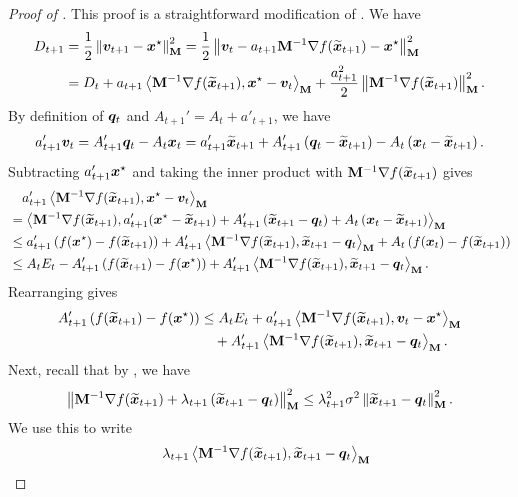 \begin{proof}[Proof of ]
This proof is a straightforward modification of \cite[Proposition 1]{chjjs22}. We have
\begin{align*}
    D_{t+1} &= \frac{1}{2}\left\lVert \bm{v}_{t+1}-\bm{x}^{\star} \right\rVert_{\mathbf{M}}^2 = \frac{1}{2}\left\lVert \bm{v}_t-a_{t+1}\mathbf{M}^{-1}\nabla f(\widetilde{\bm{x}}_{t+1})-\bm{x}^{\star} \right\rVert_{\mathbf{M}}^2 \\
    &= D_t + a_{t+1}\left\langle \mathbf{M}^{-1}\nabla f(\widetilde{\bm{x}}_{t+1}), \bm{x}^{\star}-\bm{v}_t \right\rangle_{\mathbf{M}} + \frac{a_{t+1}^2}{2}\left\lVert \mathbf{M}^{-1}\nabla f(\widetilde{\bm{x}}_{t+1}) \right\rVert_{\mathbf{M}}^2.
\end{align*}
By definition of $\bm{q}_t$ and $A_{t+1}' = A_t + a'_{t+1}$, we have
\begin{align*}
    a_{t+1}'\bm{v}_t = A_{t+1}'\bm{q}_t - A_t\bm{x}_t = a_{t+1}'\widetilde{\bm{x}}_{t+1} + A'_{t+1}\left(\bm{q}_t-\widetilde{\bm{x}}_{t+1}\right) - A_t\left(\bm{x}_t-\widetilde{\bm{x}}_{t+1}\right).
\end{align*}
Subtracting $a_{t+1}'\bm{x}^{\star}$ and taking the inner product with $\mathbf{M}^{-1}\nabla f(\widetilde{\bm{x}}_{t+1})$ gives
\begin{align*}
    &\quad a_{t+1}'\left\langle \mathbf{M}^{-1}\nabla f(\widetilde{\bm{x}}_{t+1}), \bm{x}^{\star}-\bm{v}_t \right\rangle_{\mathbf{M}} \\
    &= \left\langle \mathbf{M}^{-1}\nabla f(\widetilde{\bm{x}}_{t+1}),  a_{t+1}'(\bm{x}^{\star}-\widetilde{\bm{x}}_{t+1}) + A'_{t+1}\left(\widetilde{\bm{x}}_{t+1}-\bm{q}_t\right) + A_t\left(\bm{x}_t-\widetilde{\bm{x}}_{t+1}\right) \right\rangle_{\mathbf{M}} \\
    &\le a_{t+1}'\left(f(\bm{x}^{\star})-f(\widetilde{\bm{x}}_{t+1})\right)+A_{t+1}'\left\langle \mathbf{M}^{-1}\nabla f(\widetilde{\bm{x}}_{t+1}),\widetilde{\bm{x}}_{t+1}-\bm{q}_t \right\rangle_{\mathbf{M}} + A_t\left(f(\bm{x}_t)-f(\widetilde{\bm{x}}_{t+1})\right) \\
    &\le A_tE_t-A_{t+1}'\left(f(\widetilde{\bm{x}}_{t+1})-f(\bm{x}^{\star})\right)+A_{t+1}'\left\langle \mathbf{M}^{-1}\nabla f(\widetilde{\bm{x}}_{t+1}),\widetilde{\bm{x}}_{t+1}-\bm{q}_t \right\rangle_{\mathbf{M}}.
\end{align*}
Rearranging gives
\begin{align*}
    A_{t+1}'\left(f(\widetilde{\bm{x}}_{t+1})-f(\bm{x}^{\star})\right) &\le A_tE_t+a_{t+1}'\left\langle \mathbf{M}^{-1}\nabla f(\widetilde{\bm{x}}_{t+1}), \bm{v}_t-\bm{x}^{\star} \right\rangle_{\mathbf{M}}\\
    &\quad +A_{t+1}'\left\langle \mathbf{M}^{-1}\nabla f(\widetilde{\bm{x}}_{t+1}),\widetilde{\bm{x}}_{t+1}-\bm{q}_t \right\rangle_{\mathbf{M}}.
\end{align*}
Next, recall that by , we have
\begin{align*}
    \left\lVert \mathbf{M}^{-1}\nabla f(\widetilde{\bm{x}}_{t+1})+\lambda_{t+1}\left(\widetilde{\bm{x}}_{t+1}-\bm{q}_t\right) \right\rVert_{\mathbf{M}}^2 \le \lambda_{t+1}^2\sigma^2\left\lVert \widetilde{\bm{x}}_{t+1}-\bm{q}_t \right\rVert_{\mathbf{M}}^2.
\end{align*}
We use this to write
\begin{align*}
    &\quad \lambda_{t+1}\ip{\mM^{-1}\nabla f(\xtilde_{t+1}),\xtilde_{t+1}-\vq_t}_{\mM} \\

\end{align*}
\end{proof}
